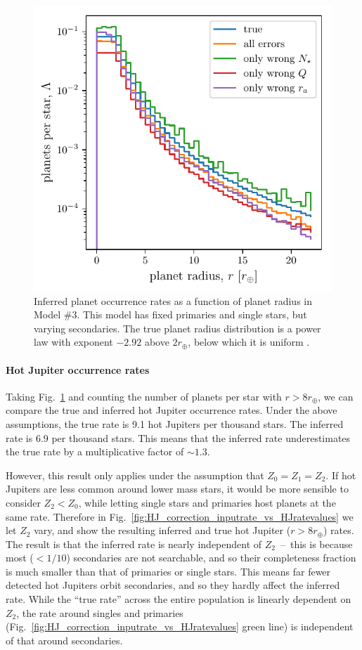 \begin{figure}[!tb]
    \centering
    \includegraphics[width=.6\textwidth]{figures/errcases_rate_density_vs_radius_logs_model_3.pdf}
    \caption{
        Inferred planet occurrence rates as a function of planet radius in 
        Model 
        \#3.
        This model has fixed primaries and single stars, but varying 
        secondaries.
        The true planet radius distribution is a power law with exponent 
        $-2.92$ 
        above $2r_\oplus$, below which it is uniform \citep[similar 
        to][]{howard_planet_2012}.
    }
    \label{fig:errcases_model_3_log}
\end{figure}

\paragraph{Hot Jupiter occurrence rates}
Taking Fig.~\ref{fig:errcases_model_3_log} and counting the number of planets 
per star with $r>8r_\oplus$, we can compare the true and inferred hot Jupiter 
occurrence rates.
Under the above assumptions, the true rate is 9.1 hot Jupiters 
per thousand stars.
The inferred rate is 6.9 per thousand stars.
This means that the inferred rate underestimates the true rate by a 
multiplicative factor of $\sim\!1.3$.

However, this result only applies under the assumption that $Z_0 = 
Z_1 = Z_2$.
If hot Jupiters are less common around lower mass stars, it would be more 
sensible to consider $Z_2<Z_0$, while letting single stars and 
primaries host planets at the same rate.
Therefore in Fig.~\ref{fig:HJ_correction_inputrate_vs_HJratevalues} we let 
$Z_2$ vary, and show the resulting inferred and true hot Jupiter 
($r>8r_\oplus$) rates.
The result is that the inferred rate is nearly independent of 
$Z_2$~--~this is because most ($<1/10$) secondaries are not searchable, 
and so their completeness fraction is much smaller than that of primaries or 
single stars.
This means far fewer detected hot Jupiters orbit secondaries, and so they 
hardly affect the inferred rate.
While the ``true rate'' across the entire population is linearly dependent on 
$Z_2$, the rate around 
singles and primaries (Fig.~\ref{fig:HJ_correction_inputrate_vs_HJratevalues} 
green line) is independent of that around secondaries.

